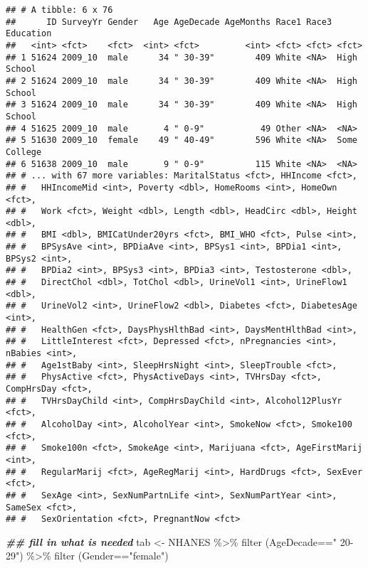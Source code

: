 \documentclass[
]{article}
\newenvironment{Shaded}{\begin{snugshade}}{\end{snugshade}}
\newcommand{\DocumentationTok}[1]{\textcolor[rgb]{0.56,0.35,0.01}{\textbf{\textit{#1}}}}
\newcommand{\FunctionTok}[1]{\textcolor[rgb]{0.00,0.00,0.00}{#1}}
\newcommand{\NormalTok}[1]{#1}
\newcommand{\OtherTok}[1]{\textcolor[rgb]{0.56,0.35,0.01}{#1}}
\newcommand{\SpecialCharTok}[1]{\textcolor[rgb]{0.00,0.00,0.00}{#1}}
\newcommand{\StringTok}[1]{\textcolor[rgb]{0.31,0.60,0.02}{#1}}
\begin{document}
\begin{verbatim}
## # A tibble: 6 x 76
##      ID SurveyYr Gender   Age AgeDecade AgeMonths Race1 Race3 Education   
##   <int> <fct>    <fct>  <int> <fct>         <int> <fct> <fct> <fct>       
## 1 51624 2009_10  male      34 " 30-39"        409 White <NA>  High School 
## 2 51624 2009_10  male      34 " 30-39"        409 White <NA>  High School 
## 3 51624 2009_10  male      34 " 30-39"        409 White <NA>  High School 
## 4 51625 2009_10  male       4 " 0-9"           49 Other <NA>  <NA>        
## 5 51630 2009_10  female    49 " 40-49"        596 White <NA>  Some College
## 6 51638 2009_10  male       9 " 0-9"          115 White <NA>  <NA>        
## # ... with 67 more variables: MaritalStatus <fct>, HHIncome <fct>,
## #   HHIncomeMid <int>, Poverty <dbl>, HomeRooms <int>, HomeOwn <fct>,
## #   Work <fct>, Weight <dbl>, Length <dbl>, HeadCirc <dbl>, Height <dbl>,
## #   BMI <dbl>, BMICatUnder20yrs <fct>, BMI_WHO <fct>, Pulse <int>,
## #   BPSysAve <int>, BPDiaAve <int>, BPSys1 <int>, BPDia1 <int>, BPSys2 <int>,
## #   BPDia2 <int>, BPSys3 <int>, BPDia3 <int>, Testosterone <dbl>,
## #   DirectChol <dbl>, TotChol <dbl>, UrineVol1 <int>, UrineFlow1 <dbl>,
## #   UrineVol2 <int>, UrineFlow2 <dbl>, Diabetes <fct>, DiabetesAge <int>,
## #   HealthGen <fct>, DaysPhysHlthBad <int>, DaysMentHlthBad <int>,
## #   LittleInterest <fct>, Depressed <fct>, nPregnancies <int>, nBabies <int>,
## #   Age1stBaby <int>, SleepHrsNight <int>, SleepTrouble <fct>,
## #   PhysActive <fct>, PhysActiveDays <int>, TVHrsDay <fct>, CompHrsDay <fct>,
## #   TVHrsDayChild <int>, CompHrsDayChild <int>, Alcohol12PlusYr <fct>,
## #   AlcoholDay <int>, AlcoholYear <int>, SmokeNow <fct>, Smoke100 <fct>,
## #   Smoke100n <fct>, SmokeAge <int>, Marijuana <fct>, AgeFirstMarij <int>,
## #   RegularMarij <fct>, AgeRegMarij <int>, HardDrugs <fct>, SexEver <fct>,
## #   SexAge <int>, SexNumPartnLife <int>, SexNumPartYear <int>, SameSex <fct>,
## #   SexOrientation <fct>, PregnantNow <fct>
\end{verbatim}

\begin{Shaded}
\begin{Highlighting}[]
\DocumentationTok{\#\# fill in what is needed}
\NormalTok{tab }\OtherTok{\textless{}{-}}\NormalTok{ NHANES }\SpecialCharTok{\%\textgreater{}\%} \FunctionTok{filter}\NormalTok{ (AgeDecade}\SpecialCharTok{==}\StringTok{" 20{-}29"}\NormalTok{) }\SpecialCharTok{\%\textgreater{}\%} \FunctionTok{filter}\NormalTok{ (Gender}\SpecialCharTok{==}\StringTok{"female"}\NormalTok{)}
\end{Highlighting}
\end{Shaded}
\end{document}
